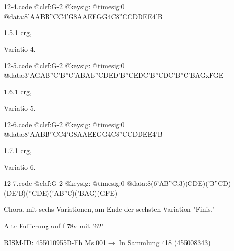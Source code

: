 \documentclass[twocolumn]{book}
\begin{document}
\begin{filecontents*}{12-4.code}
@clef:G-2
@keysig:
@timesig:0
@data:{8'AABB}{''CC}4'G{8AAEE}{GG}4C{8''CCDD}{EE}4'B
\end{filecontents*}
\newline
%
\par 1.5.1  org, \begin{itshape}Variatio 4.\end{itshape}  
\begin{filecontents*}{12-5.code}
@clef:G-2
@keysig:
@timesig:0
@data:{3'AGAB}{''C'B''C'A}{BAB''C}{DED'B}{''CEDC}{'B''CDC}{'B''C'BA}{GxFGE}
\end{filecontents*}
\newline
%
\par 1.6.1  org, \begin{itshape}Variatio 5.\end{itshape}  
\begin{filecontents*}{12-6.code}
@clef:G-2
@keysig:
@timesig:0
@data:{8'AABB}{''CC}4'G{8AAEE}{GG}4C{8''CCDD}{EE}4'B
\end{filecontents*}
\newline
%
\par 1.7.1  org, \begin{itshape}Variatio 6.\end{itshape}  
\begin{filecontents*}{12-7.code}
@clef:G-2
@keysig:
@timesig:0
@data:8(6{'AB''C};3)({CDE})({'B''CD})({DE'B})({''CDE})({'AB''C})({'BAG})({GFE})
\end{filecontents*}
\newline
%
\par Choral mit sechs Variationen, am Ende der sechsten Variation "Finis."
\par Alte Foliierung auf f.78v mit "62"
\par RISM-ID: 455010955\newline D-Fh  Ms 001\newline $\rightarrow$ In Sammlung 418 (455008343)
      
\end{document}
